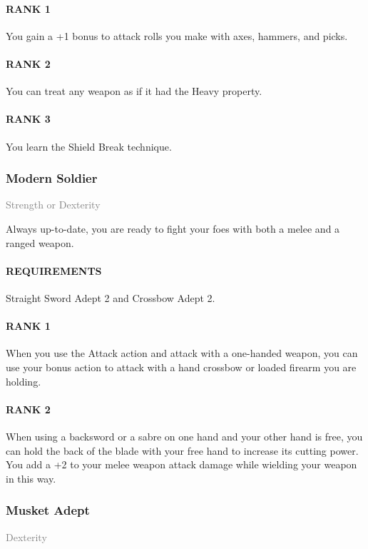 \paragraph{RANK 1} You gain a +1 bonus to attack rolls you make with axes, hammers, and picks.
\paragraph{RANK 2} You can treat any weapon as if it had the Heavy property.
\paragraph{RANK 3} You learn the Shield Break technique.

\subsubsection{Modern Soldier} \label{feat::modernsoldier}
\small{\textcolor{gray}{Strength or Dexterity}}

\normalsize
Always up-to-date, you are ready to fight your foes with both a melee and a ranged weapon.
\paragraph{REQUIREMENTS} Straight Sword Adept 2 and Crossbow Adept 2.
\paragraph{RANK 1} When you use the Attack action and attack with a one-handed weapon, you can use your bonus action to attack with a hand crossbow or loaded firearm you are holding.
\paragraph{RANK 2} When using a backsword or a sabre on one hand and your other hand is free, you can hold the back of the blade with your free hand to increase its cutting power.
You add a +2 to your melee weapon attack damage while wielding your weapon in this way.

\subsubsection{Musket Adept} \label{feat::musketadept}
\small{\textcolor{gray}{Dexterity}}

